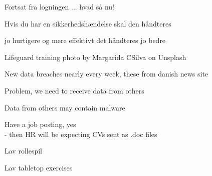 \documentclass[Screen16to9,17pt]{foils}
\begin{document}







\begin{list2}
\item Fortsat fra logningen ... hvad så nu!
\item Hvis du har en sikkerhedshændelse skal den håndteres
\item jo hurtigere og mere effektivt det håndteres jo bedre
\end{list2}

Lifeguard training photo by Margarida CSilva on Unsplash



New data breaches nearly every week, these from danish news site 

Problem, we need to receive data from others

Data from others may contain malware

Have a job posting, yes\\
- then HR will be expecting CVs sent as .doc files


\begin{list2}
\item Lav rollespil
\item Lav tabletop exercises
\end{list2}



\begin{center}
\hlkbig

\myname

\end{center}
\end{document}
